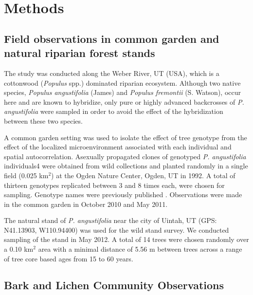\documentclass[fleqn,10pt]{wlscirep}
\begin{document}
\section*{Methods}


\subsection*{Field observations in common garden and natural riparian
  forest stands}

The study was conducted along the Weber River, UT (USA), which is a
cottonwood (\textit{Populus} spp.) dominated riparian
ecosystem. Although two native species, \textit{Populus angustifolia}
(James) and \textit{Populus fremontii} (S. Watson), occur here and are
known to hybridize, only pure or highly advanced backcrosses of
\textit{P. angustifolia} were sampled in order to avoid the effect of
the hybridization between these two species.

A common garden setting was used to isolate the effect of tree
genotype from the effect of the localized microenvironment associated
with each individual and spatial autocorrelation. Asexually propagated
clones of genotyped \textit{P. angustifolia} individuals4 were
obtained from wild collections and planted randomly in a single field
(0.025 km$^2$) at the Ogden Nature Center, Ogden, UT in 1992. A total
of thirteen genotypes replicated between 3 and 8 times each, were
chosen for sampling. Genotype names were previously published
\cite{Ellison2005}. Observations were made in the common garden in
October 2010 and May 2011.

The natural stand of \textit{P. angustifolia} near the city of Uintah,
UT (GPS:  N41.13903, W110.94400) was used for the wild stand
survey. We conducted sampling of the stand in May 2012. A total of 14
trees were chosen randomly over a 0.10 km$^2$ area with a minimal
distance of 5.56 m between trees across a range of tree core based
ages from 15 to 60 years.

\subsection*{Bark and Lichen Community Observations}
\end{document}
